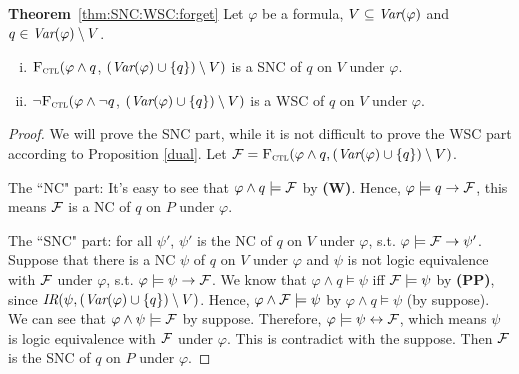 \documentclass{article}
\begin{document}
\textbf{Theorem}~\ref{thm:SNC:WSC:forget} Let $\varphi$ be a formula, $V\subseteq\textit{Var}(\varphi)$ and $q\in\textit{Var}(\varphi)\setminus V$.
 \begin{enumerate}[(i)]
   \item ${\textsc{F}_{\textsc{ctl}}} (\varphi \land q$, $(\textit{Var}(\varphi) \cup \{q\})\setminus V)$
   is a SNC of $q$ on $V$ under $\varphi$.
   \item  $\neg{\textsc{F}_{\textsc{ctl}}} (\varphi \land \neg q$, $(\textit{Var}(\varphi) \cup \{q\})\setminus V)$
   is a WSC of $q$ on $V$ under $\varphi$.
 \end{enumerate}
\begin{proof}
 We will prove the SNC part, while it is not difficult to prove the WSC part according to Proposition \ref{dual}.
 Let ${\cal F}={\textsc{F}_{\textsc{ctl}}}(\varphi \wedge q, (\textit{Var}(\varphi) \cup \{q\})\setminus V)$.

   The ``NC" part: It's easy to see that $\varphi \wedge q \models {\cal F}$ by {\bfseries (W)}. Hence, $\varphi\models q \rightarrow {\cal F}$, this means
   ${\cal F}$ is a NC of $q$ on $P$ under $\varphi$.

    The ``SNC" part: for all $\psi'$, $\psi'$ is the NC of $q$ on $V$ under $\varphi$, s.t. $\varphi \models {\cal F} \rightarrow \psi'$.
    Suppose that there is a NC $\psi$ of $q$ on $V$ under $\varphi$ and $\psi$ is not logic equivalence with ${\cal F}$ under $\varphi$, s.t. $\varphi \models \psi \rightarrow {\cal F}$.
    We know that $\varphi \wedge q \models \psi$ iff ${\cal F} \models \psi$ by {\bfseries (PP)}, since $\emph{IR}(\psi, (\textit{Var}(\varphi) \cup \{q\})\setminus V)$. Hence, $\varphi \wedge {\cal F} \models \psi$ by $\varphi \wedge q \models \psi$ (by suppose).
    We can see that $\varphi \wedge \psi \models {\cal F}$ by suppose. Therefore, $\varphi \models \psi \leftrightarrow {\cal F}$, which means $\psi$ is logic equivalence with ${\cal F}$ under $\varphi$.
    This is contradict with the suppose. Then ${\cal F}$ is the SNC of $q$ on $P$ under $\varphi$.
 \end{proof}
\end{document}
